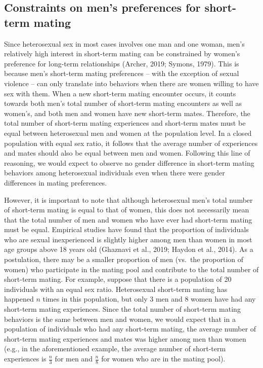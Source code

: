 \documentclass[
  11pt,
]{article}
\begin{document}
\hypertarget{constraints-on-mens-preferences-for-short-term-mating}{%
\subsection{Constraints on men's preferences for short-term
mating}\label{constraints-on-mens-preferences-for-short-term-mating}}

Since heterosexual sex in most cases involves one man and one woman,
men's relatively high interest in short-term mating can be constrained
by women's preference for long-term relationships (Archer, 2019; Symons,
1979). This is because men's short-term mating preferences -- with the
exception of sexual violence -- can only translate into behaviors when
there are women willing to have sex with them. When a new short-term
mating encounter occurs, it counts towards both men's total number of
short-term mating encounters as well as women's, and both men and women
have new short-term mates. Therefore, the total number of short-term
mating experiences and short-term mates must be equal between
heterosexual men and women at the population level. In a closed
population with equal sex ratio, it follows that the average number of
experiences and mates should also be equal between men and women.
Following this line of reasoning, we would expect to observe no gender
difference in short-term mating behaviors among heterosexual individuals
even when there were gender differences in mating preferences.

However, it is important to note that although heterosexual men's total
number of short-term mating is equal to that of women, this does not
necessarily mean that the total number of men and women who have ever
had short-term mating must be equal. Empirical studies have found that
the proportion of individuals who are sexual inexperienced is slightly
higher among men than women in most age groups above 18 years old
(Ghaznavi et al., 2019; Haydon et al., 2014). As a postulation, there
may be a smaller proportion of men (vs.~the proportion of women) who
participate in the mating pool and contribute to the total number of
short-term mating. For example, suppose that there is a population of 20
individuals with an equal sex ratio. Heterosexual short-term mating has
happened \(n\) times in this population, but only 3 men and 8 women have
had any short-term mating experiences. Since the total number of
short-term mating behaviors is the same between men and women, we would
expect that in a population of individuals who had any short-term
mating, the average number of short-term mating experiences and mates
was higher among men than women (e.g., in the aforementioned example,
the average number of short-term experiences is \(\frac{n}{3}\) for men
and \(\frac{n}{8}\) for women who are in the mating pool).
\end{document}
